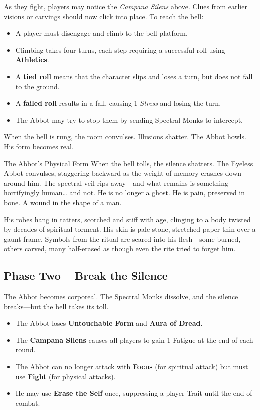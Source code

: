 As they fight, players may notice the \emph{Campana Silens} above. Clues from earlier visions or carvings should now click into place. To reach the bell:

\begin{Example}{}
    \begin{itemize}\raggedright
    \item A player must disengage and climb to the bell platform.
    \item Climbing takes four turns, each step requiring a successful  roll using \textbf{Athletics}.
    \item A \textbf{tied roll} means that the character slips and loses a turn, but does not fall to the ground.
    \item A \textbf{failed roll} results in a fall, causing 1 \emph{Stress} and losing the turn.
    \item The Abbot may try to stop them by sending Spectral Monks to intercept.
    \end{itemize}
\end{Example}


When the bell is rung, the room convulses. Illusions shatter. The Abbot howls. His form becomes real.

\begin{Example}{The Abbot's Physical Form}
    When the bell tolls, the silence shatters.  The Eyeless Abbot convulses, staggering backward as the weight of memory crashes down around him. The spectral veil rips away—and what remains is something horrifyingly human… and not. He is no longer a ghost. He is pain, preserved in bone. A wound in the shape of a man.
    
    His robes hang in tatters, scorched and stiff with age, clinging to a body twisted by decades of spiritual torment. His skin is pale stone, stretched paper-thin over a gaunt frame. Symbols from the ritual are seared into his flesh—some burned, others carved, many half-erased as though even the rite tried to forget him.
\end{Example}


\subsection*{Phase Two – Break the Silence}

The Abbot becomes corporeal. The Spectral Monks dissolve, and the silence breaks—but the bell takes its toll.
\begin{Example}{}
    \begin{itemize}
    \item The Abbot loses \textbf{Untouchable Form} and \textbf{Aura of Dread}.
    \item The \textbf{Campana Silens} causes all players to gain 1 Fatigue at the end of each round.
    \item The Abbot can no longer attack with \textbf{Focus} (for spiritual attack) but must use \textbf{Fight} (for physical attacks).
    \item He may use \textbf{Erase the Self} once, suppressing a player Trait until the end of combat.
    \end{itemize}
\end{Example}

